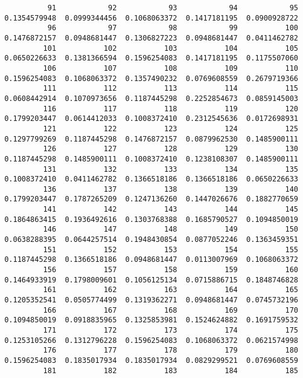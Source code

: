 \documentclass[
  letterpaper,
  DIV=11,
  numbers=noendperiod]{scrreprt}
\begin{document}
\begin{verbatim}
           91            92            93            94            95 
 0.1354579948  0.0999344456  0.1068063372  0.1417181195  0.0900928722 
           96            97            98            99           100 
 0.1476872157  0.0948681447  0.1306827223  0.0948681447  0.0411462782 
          101           102           103           104           105 
 0.0650226633  0.1381366594  0.1596254083  0.1417181195  0.1175507060 
          106           107           108           109           110 
 0.1596254083  0.1068063372  0.1357490232  0.0769608559  0.2679719366 
          111           112           113           114           115 
 0.0608442914  0.1070973656  0.1187445298  0.2252854673  0.0859145003 
          116           117           118           119           120 
 0.1799203447  0.0614412033  0.1008372410  0.2312545636  0.0172698931 
          121           122           123           124           125 
 0.1297799269  0.1187445298  0.1476872157  0.0879962530  0.1485900111 
          126           127           128           129           130 
 0.1187445298  0.1485900111  0.1008372410  0.1238108307  0.1485900111 
          131           132           133           134           135 
 0.1008372410  0.0411462782  0.1366518186  0.1366518186  0.0650226633 
          136           137           138           139           140 
 0.1799203447  0.1787265209  0.1247136260  0.1447026676  0.1882770659 
          141           142           143           144           145 
 0.1864863415  0.1936492616  0.1303768388  0.1685790527  0.1094850019 
          146           147           148           149           150 
 0.0638288395  0.0644257514  0.1948430854  0.0877052246  0.1363459351 
          151           152           153           154           155 
 0.1187445298  0.1366518186  0.0948681447  0.0113007969  0.1068063372 
          156           157           158           159           160 
 0.1464933919  0.1798009601  0.1056125134  0.0715886715  0.1848746828 
          161           162           163           164           165 
 0.1205352541  0.0505774499  0.1319362271  0.0948681447  0.0745732196 
          166           167           168           169           170 
 0.1094850019  0.0918835965  0.1325853981  0.1524624882  0.1691759532 
          171           172           173           174           175 
 0.1253105266  0.1312796228  0.1596254083  0.1068063372  0.0621574998 
          176           177           178           179           180 
 0.1596254083  0.1835017934  0.1835017934  0.0829299521  0.0769608559 
          181           182           183           184           185 

\end{verbatim}
\end{document}
